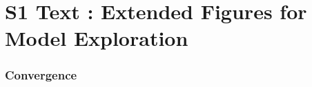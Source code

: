 



\section*{S1 Text : Extended Figures for Model Exploration}


\subsubsection*{Convergence}




\begin{figure}
\centering
\caption{}
\label{fig:ext-sensitivity-1}
\end{figure}





